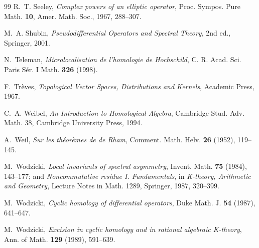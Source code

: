 \documentclass[11pt,oneside,reqno]{article}
\theoremstyle{plain}
\theoremstyle{definition}
\theoremstyle{remark}
\begin{document}
\begin{thebibliography}{99}
R.~T. Seeley,
\emph{Complex powers of an elliptic operator},
Proc. Sympos. Pure Math. \textbf{10}, Amer. Math. Soc., 1967, 288--307.

M.~A. Shubin,
\emph{Pseudodifferential Operators and Spectral Theory}, 2nd ed., Springer, 2001.

N.~Teleman,
\emph{Microlocalisation de l'homologie de Hochschild},
C. R. Acad. Sci. Paris Sér. I Math. \textbf{326} (1998).

F.~Trèves,
\emph{Topological Vector Spaces, Distributions and Kernels}, Academic Press, 1967.

C.~A. Weibel,
\emph{An Introduction to Homological Algebra},
Cambridge Stud. Adv. Math. 38, Cambridge University Press, 1994.

A.~Weil,
\emph{Sur les théorèmes de de Rham},
Comment. Math. Helv. \textbf{26} (1952), 119--145.

M.~Wodzicki,
\emph{Local invariants of spectral asymmetry},
Invent. Math. \textbf{75} (1984), 143--177; and
\emph{Noncommutative residue I. Fundamentals}, in \emph{K-theory, Arithmetic and
Geometry}, Lecture Notes in Math. 1289, Springer, 1987, 320--399.

M.~Wodzicki,
\emph{Cyclic homology of differential operators},
Duke Math. J. \textbf{54} (1987), 641--647.

M.~Wodzicki,
\emph{Excision in cyclic homology and in rational algebraic K-theory},
Ann. of Math. \textbf{129} (1989), 591--639.

\end{thebibliography}
\end{document}
